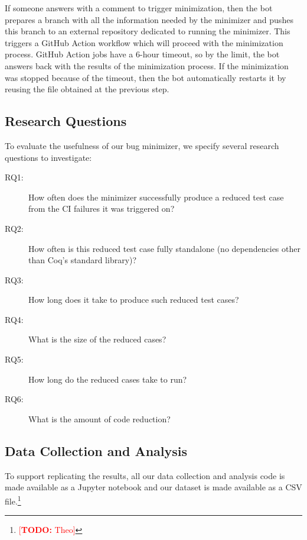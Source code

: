 \documentclass[a4paper,USenglish,cleveref,autoref,thm-restate]{lipics-v2021}
\makeatletter
\newcommand{\todo}[1]{%
\@latex@warning{TODO: \detokenize{#1} on page \thepage}%
\textcolor{red}{[\textbf{TODO:} #1]}}%
\makeatother
\begin{document}
If someone answers with a comment to trigger minimization, then the bot prepares a branch with all the information needed by the minimizer and pushes this branch to an external repository dedicated to running the minimizer. This triggers a GitHub Action workflow which will proceed with the minimization process. GitHub Action jobs have a 6-hour timeout, so by the limit, the bot answers back with the results of the minimization process. If the minimization was stopped because of the timeout, then the bot automatically restarts it by reusing the file obtained at the previous step.

\subsection{Research Questions}

To evaluate the usefulness of our bug minimizer, we specify several research questions to investigate:

\begin{description}
\item[RQ1:] How often does the minimizer successfully produce a reduced test case from the CI failures it was triggered on?
\item[RQ2:] How often is this reduced test case fully standalone (no dependencies other than Coq's standard library)?
\item[RQ3:] How long does it take to produce such reduced test cases?
\item[RQ4:] What is the size of the reduced cases?
\item[RQ5:] How long do the reduced cases take to run?
\item[RQ6:] What is the amount of code reduction?
\end{description}

\subsection{Data Collection and Analysis}

To support replicating the results, all our data collection and analysis code is made available as a Jupyter notebook and our dataset is made available as a CSV file.\footnote{\todo{Theo}}
\end{document}
